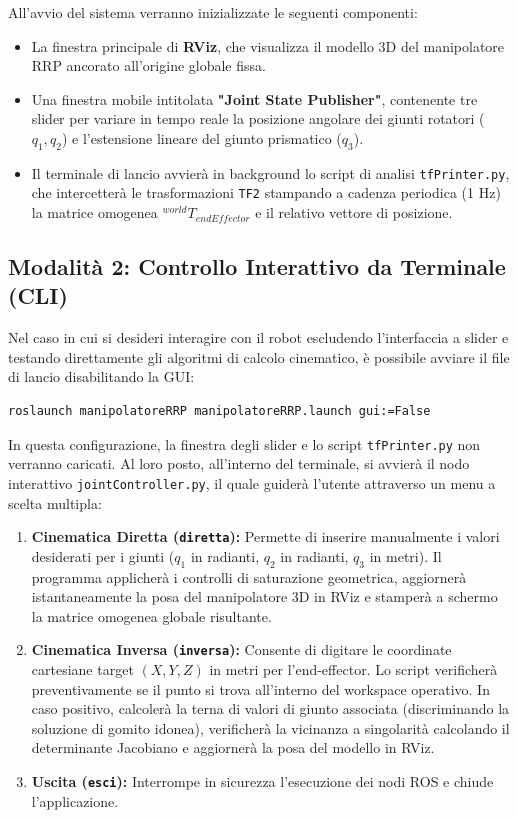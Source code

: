\documentclass[11pt, a4paper]{report}
\begin{document}
All'avvio del sistema verranno inizializzate le seguenti componenti:
\begin{itemize}
    \item La finestra principale di \textbf{RViz}, che visualizza il modello 3D del manipolatore RRP ancorato all'origine globale fissa.
    \item Una finestra mobile intitolata \textbf{"Joint State Publisher"}, contenente tre slider per variare in tempo reale la posizione angolare dei giunti rotatori (\(q_1, q_2\)) e l'estensione lineare del giunto prismatico (\(q_3\)).
    \item Il terminale di lancio avvierà in background lo script di analisi \texttt{tfPrinter.py}, che intercetterà le trasformazioni \texttt{TF2} stampando a cadenza periodica (1 Hz) la matrice omogenea \(^{world}T_{endEffector}\) e il relativo vettore di posizione.
\end{itemize}

\subsection{Modalità 2: Controllo Interattivo da Terminale (CLI)}
Nel caso in cui si desideri interagire con il robot escludendo l'interfaccia a slider e testando direttamente gli algoritmi di calcolo cinematico, è possibile avviare il file di lancio disabilitando la GUI:
\begin{lstlisting}[language=bash]
roslaunch manipolatoreRRP manipolatoreRRP.launch gui:=False
\end{lstlisting}

In questa configurazione, la finestra degli slider e lo script \texttt{tfPrinter.py} non verranno caricati. Al loro posto, all'interno del terminale, si avvierà il nodo interattivo \texttt{jointController.py}, il quale guiderà l'utente attraverso un menu a scelta multipla:
\begin{enumerate}
    \item \textbf{Cinematica Diretta (\texttt{diretta}):} Permette di inserire manualmente i valori desiderati per i giunti (\(q_1\) in radianti, \(q_2\) in radianti, \(q_3\) in metri). Il programma applicherà i controlli di saturazione geometrica, aggiornerà istantaneamente la posa del manipolatore 3D in RViz e stamperà a schermo la matrice omogenea globale risultante.

    \item \textbf{Cinematica Inversa (\texttt{inversa}):} Consente di digitare le coordinate cartesiane target \((X, Y, Z)\) in metri per l'end-effector. Lo script verificherà preventivamente se il punto si trova all'interno del workspace operativo. In caso positivo, calcolerà la terna di valori di giunto associata (discriminando la soluzione di gomito idonea), verificherà la vicinanza a singolarità calcolando il determinante Jacobiano e aggiornerà la posa del modello in RViz.

    \item \textbf{Uscita (\texttt{esci}):} Interrompe in sicurezza l'esecuzione dei nodi ROS e chiude l'applicazione.
\end{enumerate}
\end{document}
